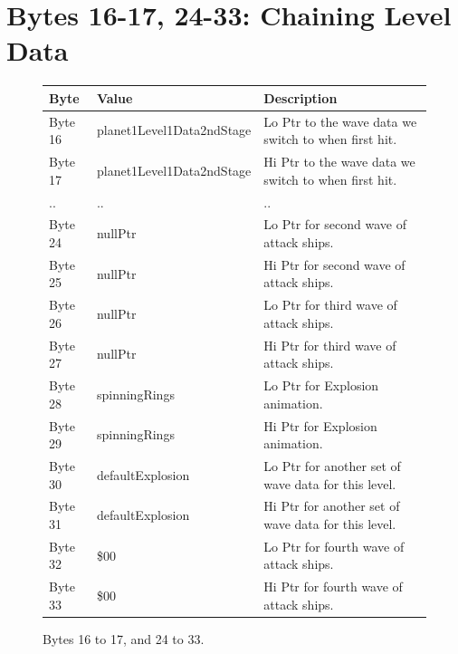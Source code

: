 \section{Bytes 16-17, 24-33: Chaining Level Data}
\begin{figure}[H]

  {
    \setlength{\tabcolsep}{3.0pt}
    \setlength\cmidrulewidth{\heavyrulewidth} %
    \begin{adjustbox}{width=13cm}

      \begin{tabular}{lll}
        \toprule
        Byte    & Value                     & Description                                                        \\
        \midrule
        Byte 16 & planet1Level1Data2ndStage & Lo Ptr to the wave data we switch to when first hit.               \\
        Byte 17 & planet1Level1Data2ndStage & Hi Ptr to the wave data we switch to when first hit.               \\
        .. & ..                       & ..\\
        Byte 24 & nullPtr                   & Lo Ptr for second wave of attack ships.                               \\
        Byte 25 & nullPtr                   & Hi Ptr for second wave of attack ships.                               \\
        Byte 26 & nullPtr                   & Lo Ptr for third wave of attack ships.                               \\
        Byte 27 & nullPtr                   & Hi Ptr for third wave of attack ships.                               \\
        Byte 28 & spinningRings             & Lo Ptr for Explosion animation.                                    \\
        Byte 29 & spinningRings             & Hi Ptr for Explosion animation.                                    \\
        Byte 30 & defaultExplosion          & Lo Ptr for another set of wave data for this level.                \\
        Byte 31 & defaultExplosion          & Hi Ptr for another set of wave data for this level.                \\
        Byte 32 & \$00                       & Lo Ptr for fourth wave of attack ships.                                                            \\
        Byte 33 & \$00                       & Hi Ptr for fourth wave of attack ships.                           \\
        \bottomrule
      \end{tabular}
    \end{adjustbox}
  }\caption*{Bytes 16 to 17, and 24 to 33.}
\end{figure}

